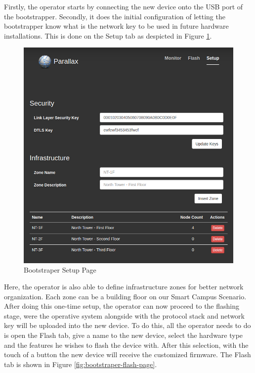 Firstly, the operator starts by connecting the new device onto the USB port of the bootstrapper.
Secondly, it does the initial configuration of letting the bootstrapper know what is the network key to be used in future hardware installations. This is done on the Setup tab as despicted in Figure \ref{fig:bootstraper-setup-page}.

\begin{figure}[h]
  \centering
  \includegraphics[width=0.7\linewidth]{figures/parallax_setup.png}
  \caption{Bootstraper Setup Page}
  \label{fig:bootstraper-setup-page}
\end{figure}

Here, the operator is also able to define infrastructure zones for better network organization. Each zone can be a building floor on our Smart Campus Scenario.\\
After doing this one-time setup, the operator can now proceed to the flashing stage, were the operative system alongside with the protocol stack and network key will be uploaded into the new device. To do this, all the operator needs to do is open the Flash tab, give a name to the new device, select the hardware type and the features he wishes to flash the device with. After this selection, with the touch of a button the new device will receive the customized firmware. The Flash tab is shown in Figure \ref{fig:bootstraper-flash-page}.


